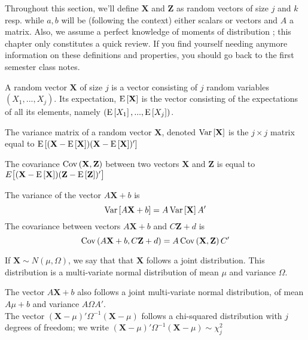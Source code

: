 Throughout this section, we'll define $\mathbf{X}$ and $\mathbf{Z}$ as random vectors of size $j$ and $k$ resp. while $a,b$ will be (following the context) either scalars or vectors and $A$ a matrix. Also, we assume a perfect knowledge of moments of distribution ; this chapter only constitutes a quick review. If you find yourself needing anymore information on these definitions and properties, you should go back to the first semester class notes.

\begin{definition}
A random vector $\mathbf{X}$ of size $j$ is a vector consisting of $j$ random variables $(X_1, ..., X_j)$. Its expectation, $\operatorname{E}\left[\mathbf{X}\right]$ is the vector consisting of the expectations of all its elements, namely $(\operatorname{E}\left[X_1\right], ..., \operatorname{E}\left[X_j\right])$.
\end{definition}

\begin{definition}
The variance matrix of a random vector $\mathbf{X}$, denoted $\operatorname{Var}\left[\mathbf{X}\right]$ is the $j\times j$ matrix equal to $\operatorname{E}\left[(\mathbf{X} - \operatorname{E}\left[\mathbf{X}\right])(\mathbf{X} - \operatorname{E}\left[\mathbf{X}\right])'\right]$
\end{definition}
\begin{definition}
The covariance $\operatorname{Cov}\left(\mathbf{X},\mathbf{Z}\right)$ between two vectors $\mathbf{X}$ and $\mathbf{Z}$ is equal to $E\big[ (\mathbf{X} - \operatorname{E}\left[\mathbf{X}\right])(\mathbf{Z} - \operatorname{E}\left[\mathbf{Z}\right])'\big]$
\end{definition}

\begin{remark}
The variance of the vector $A\mathbf{X} + b$ is $$\operatorname{Var}\left[A \mathbf{X} + b\right] = A \operatorname{Var}\left[\mathbf{X}\right]A'$$ The covariance between vectors $A\mathbf{X} + b$ and $C\mathbf{Z} + d$ is $$\operatorname{Cov}\left(A \mathbf{X} + b,C\mathbf{Z} + d\right) = A \operatorname{Cov}\left(\mathbf{X},\mathbf{Z}\right) C'$$
\end{remark}

\begin{definition}
If $\mathbf{X} \sim N(\mu, \Omega)$, we say that that $\mathbf{X}$ follows a joint distribution. This distribution is a multi-variate normal distribution of mean $\mu$ and variance $\Omega$.
\end{definition}
\begin{remark} 
The vector $A\mathbf{X}+b$ also follows a joint multi-variate normal distribution, of mean $A\mu+b$ and variance $A\Omega A'$.\\
The vector $(\mathbf{X} - \mu)'\Omega^{-1}(\mathbf{X}-\mu)$ follows a chi-squared distribution with $j$ degrees of freedom; we write $(\mathbf{X} - \mu)'\Omega^{-1}(\mathbf{X}-\mu)\sim\chi_j^2$
\end{remark}

